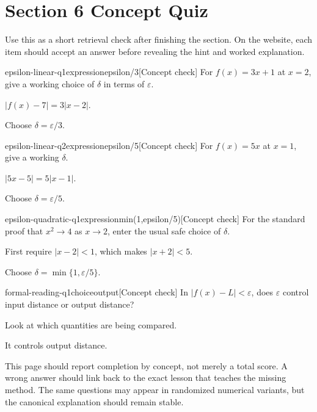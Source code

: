 \section*{Section 6 Concept Quiz}

Use this as a short retrieval check after finishing the section. On the website, each item should accept an answer before revealing the hint and worked explanation.

\begin{bgcheck}{epsilon-linear-q1}{expression}{epsilon/3}[Concept check]
For \(f(x)=3x+1\) at \(x=2\), give a working choice of \(\delta\) in terms of \(\varepsilon\).
\begin{bghint}
\(|f(x)-7|=3|x-2|\).
\end{bghint}
\begin{bgreveal}
Choose \(\delta=\varepsilon/3\).
\end{bgreveal}
\end{bgcheck}

\begin{bgcheck}{epsilon-linear-q2}{expression}{epsilon/5}[Concept check]
For \(f(x)=5x\) at \(x=1\), give a working \(\delta\).
\begin{bghint}
\(|5x-5|=5|x-1|\).
\end{bghint}
\begin{bgreveal}
Choose \(\delta=\varepsilon/5\).
\end{bgreveal}
\end{bgcheck}

\begin{bgcheck}{epsilon-quadratic-q1}{expression}{min(1,epsilon/5)}[Concept check]
For the standard proof that \(x^2\to4\) as \(x\to2\), enter the usual safe choice of \(\delta\).
\begin{bghint}
First require \(|x-2|<1\), which makes \(|x+2|<5\).
\end{bghint}
\begin{bgreveal}
Choose \(\delta=\min\{1,\varepsilon/5\}\).
\end{bgreveal}
\end{bgcheck}

\begin{bgcheck}{formal-reading-q1}{choice}{output}[Concept check]
In \(|f(x)-L|<\varepsilon\), does \(\varepsilon\) control input distance or output distance?
\begin{bghint}
Look at which quantities are being compared.
\end{bghint}
\begin{bgreveal}
It controls output distance.
\end{bgreveal}
\end{bgcheck}

\begin{bgsummary}[title={Quiz use on the website}]
This page should report completion by concept, not merely a total score. A wrong answer should link back to the exact lesson that teaches the missing method. The same questions may appear in randomized numerical variants, but the canonical explanation should remain stable.
\end{bgsummary}
